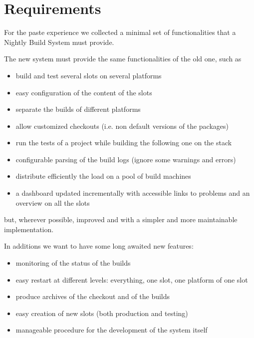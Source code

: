 \section{Requirements}
\label{sec:Requirements}
For the paste experience we collected a minimal set of functionalities that a
Nightly Build System must provide.

The new system must provide the same functionalities of the old one, such as
\begin{itemize}
  \item build and test several slots on several platforms
  \item easy configuration of the content of the slots
  \item separate the builds of different platforms
  \item allow customized checkouts (i.e. non default versions of the packages)
  \item run the tests of a project while building the following one on the stack
  \item configurable parsing of the build logs (ignore some warnings and errors)
  \item distribute efficiently the load on a pool of build machines
  \item a dashboard updated incrementally with accessible links to problems and
an overview on all the slots
\end{itemize}
but, wherever possible, improved and with a simpler and more maintainable
implementation.

In additions we want to have some long awaited new features:
\begin{itemize}
  \item monitoring of the status of the builds
  \item easy restart at different levels: everything, one slot, one platform of
one slot
  \item produce archives of the checkout and of the builds
  \item easy creation of new slots (both production and testing)
  \item manageable procedure for the development of the system itself
\end{itemize}
